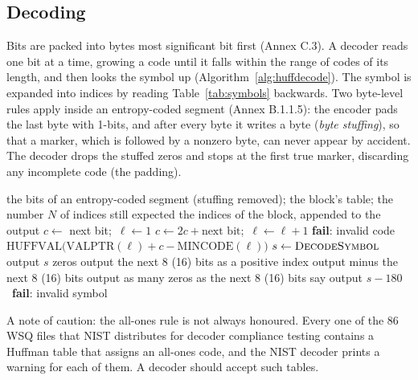 \subsection{Decoding}

Bits are packed into bytes most significant bit first (Annex C.3). A decoder reads one bit at
a time, growing a code until it falls within the range of codes of its length, and then looks
the symbol up (Algorithm~\ref{alg:huffdecode}). The symbol is expanded into indices by reading
Table~\ref{tab:symbols} backwards. Two byte-level rules apply inside an entropy-coded segment
(Annex B.1.1.5): the encoder pads the last byte with 1-bits, and after every  byte it
writes a  byte (\emph{byte stuffing}), so that a marker, which is  followed by
a nonzero byte, can never appear by accident. The decoder drops the stuffed zeros and stops at
the first true marker, discarding any incomplete code (the padding).

\begin{algorithm}[ht]
  \caption{Decoding the indices of one block.}
  \label{alg:huffdecode}
  \begin{algorithmic}[1]
    \Require the bits of an entropy-coded segment (stuffing removed); the block's table; the number $N$ of indices still expected
    \Ensure the indices of the block, appended to the output
      \State $c \gets$ next bit;\ $\ell \gets 1$
        \State $c \gets 2c + \text{next bit}$;\ $\ell \gets \ell + 1$
         \textbf{fail}: invalid code \EndIf
      \EndWhile
      \State \Return $\mathrm{HUFFVAL}\bigl(\mathrm{VALPTR}(\ell) + c - \mathrm{MINCODE}(\ell)\bigr)$
    \EndFunction
      \State $s \gets \Call{DecodeSymbol}{}$ 
       output $s$ zeros
       output the next 8 (16) bits as a positive index
       output minus the next 8 (16) bits
       output as many zeros as the next 8 (16) bits say
       output $s - 180$
      \Else\ \textbf{fail}: invalid symbol
      \EndIf
    \EndWhile
  \end{algorithmic}
\end{algorithm}

A note of caution: the all-ones rule is not always honoured. Every one of the 86 WSQ files that
NIST distributes for decoder compliance testing contains a Huffman table that assigns an
all-ones code, and the NIST decoder prints a warning for each of them. A decoder should accept
such tables.

